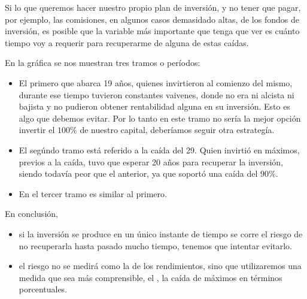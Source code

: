 Si lo que queremos hacer nuestro propio plan de inversión, y no tener que pagar, por ejemplo, las comisiones, en algunos casos demasidado altas, de los fondos de inversión, es posible que la variable más importante que tenga que ver es cuánto tiempo voy a requerir para recuperarme de alguna de estas caídas.

En la gráfica se nos muestran tres tramos o períodos:
\begin{itemize}
    \item El primero que abarca 19 años, quienes invirtieron al comienzo del mismo, durante ese tiempo tuvieron constantes vaivenes, donde no era ni alcista ni bajista y no pudieron obtener rentabilidad alguna en su inversión. Esto es algo que debemos evitar. Por lo tanto en este tramo no sería la mejor opción invertir el $100\%$ de nuestro capital, deberíamos seguir otra estrategía.
    \item El segúndo tramo está referido a la caída del 29. Quien invirtió en máximos, previos a la caída, tuvo que esperar 20 años para recuperar la inversión, siendo todavía peor que el anterior, ya que soportó una caída del $90\%$.
    \item En el tercer tramo es similar al primero.
\end{itemize}

En conclusión, 
\begin{itemize}
    \item si la inversión se produce en un único instante de tiempo se corre el riesgo de no recuperarla hasta pasado mucho tiempo, tenemos que intentar evitarlo.
    \item el riesgo no se medirá como la  de los rendimientos, sino que utilizaremos una medida que sea más comprensible, el , la caída de máximos en términos porcentuales.
\end{itemize} 

